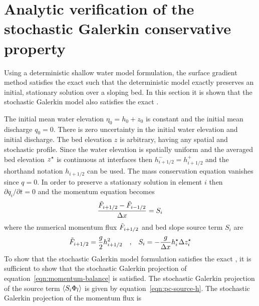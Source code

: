 \section{Analytic verification of the stochastic Galerkin conservative property}

Using a deterministic shallow water model formulation, the surface gradient method satisfies the exact \cproperty{} \citep{zhou2001} such that the deterministic model exactly preserves an initial, stationary solution over a sloping bed.
In this section it is shown that the stochastic Galerkin model also satisfies the exact \cproperty.

The initial mean water elevation $\eta_0 = h_0 + z_0 $ is constant and the initial mean discharge $q_0 = 0$.
There is zero uncertainty in the initial water elevation and initial discharge.
The bed elevation $z$ is arbitrary, having any spatial and stochastic profile.
Since the water elevation is spatially uniform and the averaged bed elevation $z^\star$ is continuous at interfaces then $h_{i+1/2}^- = h_{i+1/2}^+$ and the shorthand notation $h_{i+1/2}$ can be used.
The mass conservation equation vanishes since $q = 0$.
In order to preserve a stationary solution in element $i$ then $\partial q_i/\partial t = 0$ and the momentum equation becomes
\begin{align}
    \frac{\tilde{F}_{i+1/2} - \tilde{F}_{i-1/2}}{\Delta x} = S_i
    \label{eqn:momentum-balance}
\end{align}
where the numerical momentum flux $\tilde{F}_{i+1/2}$ and bed slope source term $S_i$ are
\begin{align}
\tilde{F}_{i+1/2} = \frac{g}{2} h_{i+1/2}^2 \text{\quad,\quad}
S_i = - \frac{g}{\Delta x} h^\star_i \Delta z^\star_i
\end{align}
To show that the stochastic Galerkin model formulation satisfies the exact \cproperty{}, it is sufficient to show that the stochastic Galerkin projection of equation~\eqref{eqn:momentum-balance} is satisfied.
The stochastic Galerkin projection of the source term $\left\langle S_i \Phi_l \right\rangle$ is given by equation~\eqref{eqn:pc-source-h}.
The stochastic Galerkin projection of the momentum flux is
